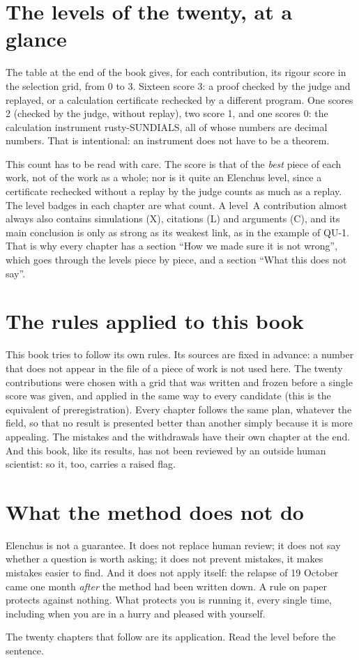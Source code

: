 \section{The levels of the twenty, at a glance}

The table at the end of the book gives, for each contribution, its rigour score in the selection grid, from 0 to 3.
Sixteen score 3: a proof checked by the judge and replayed, or a calculation certificate rechecked by a different
program. One scores 2 (checked by the judge, without replay), two score 1, and one scores 0: the calculation
instrument rusty-SUNDIALS, all of whose numbers are decimal numbers. That is intentional: an instrument does not have
to be a theorem.

This count has to be read with care. The score is that of the \emph{best} piece of each work, not of the work as a
whole; nor is it quite an Elenchus level, since a certificate rechecked without a replay by the judge counts as much
as a replay. The level badges in each chapter are what count. A level~A contribution almost always also contains
simulations (X), citations (L) and arguments (C), and its main conclusion is only as strong as its weakest link, as
in the example of QU-1. That is why every chapter has a section ``How we made sure it is not wrong'', which goes
through the levels piece by piece, and a section ``What this does not say''.

\section{The rules applied to this book}

This book tries to follow its own rules. Its sources are fixed in advance: a number that does not appear in the file
of a piece of work is not used here. The twenty contributions were chosen with a grid that was written and frozen
before a single score was given, and applied in the same way to every candidate (this is the equivalent of
preregistration). Every chapter follows the same plan, whatever the field, so that no result is presented better
than another simply because it is more appealing. The mistakes and the withdrawals have their own chapter at the end.
And this book, like its results, has not been reviewed by an outside human scientist: so it, too, carries a raised
flag.

\section{What the method does not do}

Elenchus is not a guarantee. It does not replace human review; it does not say whether a question is worth asking; it
does not prevent mistakes, it makes mistakes easier to find. And it does not apply itself: the relapse of 19 October
came one month \emph{after} the method had been written down. A rule on paper protects against nothing. What protects
you is running it, every single time, including when you are in a hurry and pleased with yourself.

The twenty chapters that follow are its application. Read the level before the sentence.
